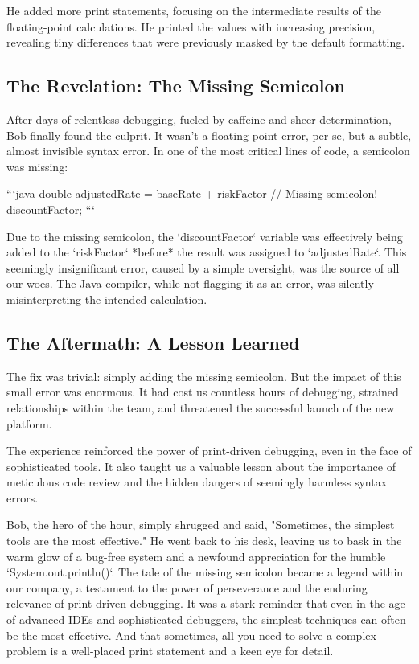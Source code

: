 \documentclass{article}
\begin{document}
{{{{He added more print statements, focusing on the intermediate results of the floating-point calculations. He printed the values with increasing precision, revealing tiny differences that were previously masked by the default formatting.

\subsection*{The Revelation: The Missing Semicolon}

After days of relentless debugging, fueled by caffeine and sheer determination, Bob finally found the culprit. It wasn't a floating-point error, per se, but a subtle, almost invisible syntax error. In one of the most critical lines of code, a semicolon was missing:

```java
double adjustedRate = baseRate + riskFactor // Missing semicolon!
discountFactor;
```

Due to the missing semicolon, the `discountFactor` variable was effectively being added to the `riskFactor` *before* the result was assigned to `adjustedRate`. This seemingly insignificant error, caused by a simple oversight, was the source of all our woes. The Java compiler, while not flagging it as an error, was silently misinterpreting the intended calculation.

\subsection*{The Aftermath: A Lesson Learned}

The fix was trivial: simply adding the missing semicolon. But the impact of this small error was enormous. It had cost us countless hours of debugging, strained relationships within the team, and threatened the successful launch of the new platform.

The experience reinforced the power of print-driven debugging, even in the face of sophisticated tools. It also taught us a valuable lesson about the importance of meticulous code review and the hidden dangers of seemingly harmless syntax errors.

Bob, the hero of the hour, simply shrugged and said, "Sometimes, the simplest tools are the most effective." He went back to his desk, leaving us to bask in the warm glow of a bug-free system and a newfound appreciation for the humble `System.out.println()`. The tale of the missing semicolon became a legend within our company, a testament to the power of perseverance and the enduring relevance of print-driven debugging. It was a stark reminder that even in the age of advanced IDEs and sophisticated debuggers, the simplest techniques can often be the most effective. And that sometimes, all you need to solve a complex problem is a well-placed print statement and a keen eye for detail.

}}}}
\end{document}
